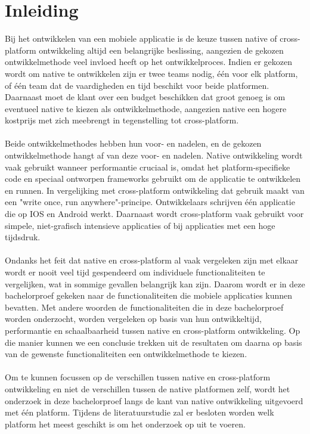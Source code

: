 
\chapter{Inleiding}
\label{ch:inleiding}

Bij het ontwikkelen van een mobiele applicatie is de keuze tussen native of cross-platform ontwikkeling altijd een belangrijke beslissing,
aangezien de gekozen ontwikkelmethode veel invloed heeft op het ontwikkelproces. 
Indien er gekozen wordt om native te ontwikkelen zijn er twee teams nodig, één voor elk platform, of één team dat de vaardigheden 
en tijd beschikt voor beide platformen. 
Daarnaast moet de klant over een budget beschikken dat groot genoeg is om eventueel native te kiezen als ontwikkelmethode, 
aangezien native een hogere kostprijs met zich meebrengt in tegenstelling tot cross-platform.
\\\\
Beide ontwikkelmethodes hebben hun voor- en nadelen, en de gekozen ontwikkelmethode hangt af van deze voor- en nadelen. 
Native ontwikkeling wordt vaak gebruikt wanneer performantie cruciaal is, 
omdat het platform-specifieke code en speciaal ontworpen frameworks gebruikt om de applicatie te ontwikkelen en runnen. 
In vergelijking met cross-platform ontwikkeling dat gebruik maakt van een "write once, run anywhere"-principe. 
Ontwikkelaars schrijven één applicatie die op IOS en Android werkt. 
Daarnaast wordt cross-platform vaak gebruikt voor simpele, niet-grafisch intensieve applicaties of bij applicaties met een hoge tijdsdruk.
\\\\
Ondanks het feit dat native en cross-platform al vaak vergeleken zijn met elkaar wordt er nooit veel tijd gespendeerd om 
individuele functionaliteiten te vergelijken, wat in sommige gevallen belangrijk kan zijn.
Daarom wordt er in deze bachelorproef gekeken naar de functionaliteiten 
die mobiele applicaties kunnen bevatten. Met andere woorden de functionaliteiten die in deze bachelorproef worden onderzocht,
worden vergeleken op basis van hun ontwikkeltijd, performantie en schaalbaarheid tussen native en cross-platform ontwikkeling.
Op die manier kunnen we een conclusie trekken uit de resultaten om daarna op basis van de gewenste functionaliteiten een ontwikkelmethode te kiezen.
\\\\
Om te kunnen focussen op de verschillen tussen native en cross-platform ontwikkeling en niet de verschillen tussen de native platformen zelf,
wordt het onderzoek in deze bachelorproef langs de kant van native ontwikkeling uitgevoerd met één platform. 
Tijdens de literatuurstudie zal er besloten worden welk platform het meest geschikt is om het onderzoek op uit te voeren. 


